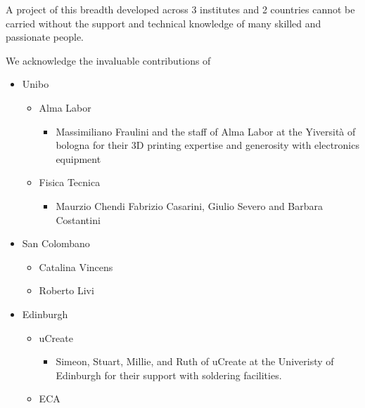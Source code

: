 \documentclass[sigconf]{nimeart}
\providecommand{\tightlist}{%
  \setlength{\itemsep}{0pt}\setlength{\parskip}{0pt}}
\begin{document}
\begin{acks}
A project of this breadth developed across 3 institutes and 2 countries
cannot be carried without the support and technical knowledge of many
skilled and passionate people.

We acknowledge the invaluable contributions of

\begin{itemize}
\tightlist
\item
  Unibo

  \begin{itemize}
  \tightlist
  \item
    Alma Labor

    \begin{itemize}
    \tightlist
    \item
      Massimiliano Fraulini and the staff of Alma Labor at the Yiversità
      of bologna for their 3D printing expertise and generosity with
      electronics equipment
    \end{itemize}
  \item
    Fisica Tecnica

    \begin{itemize}
    \tightlist
    \item
      Maurzio Chendi Fabrizio Casarini, Giulio Severo and Barbara
      Costantini
    \end{itemize}
  \end{itemize}
\item
  San Colombano

  \begin{itemize}
  \tightlist
  \item
    Catalina Vincens
  \item
    Roberto Livi
  \end{itemize}
\item
  Edinburgh

  \begin{itemize}
  \tightlist
  \item
    uCreate

    \begin{itemize}
    \tightlist
    \item
      Simeon, Stuart, Millie, and Ruth of uCreate at the Univeristy of
      Edinburgh for their support with soldering facilities.
    \end{itemize}
  \item
    ECA


\end{itemize}
\end{itemize}
\end{acks}
\end{document}
